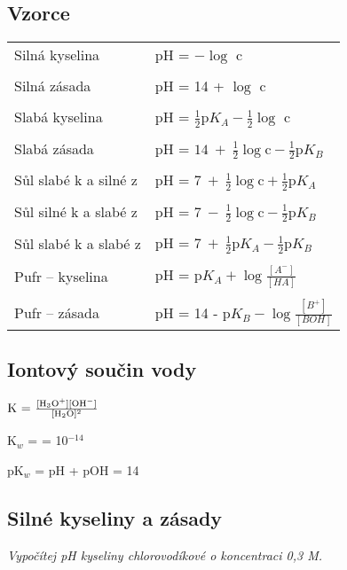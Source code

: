\subsection{Vzorce}

\begin{tabular}{ll}
	Silná kyselina & pH = $-\log$ c \\
	& \\
	Silná zásada & pH = 14 + $\log$ c \\
	& \\
	Slabá kyselina & pH = $\frac{1}{2}\textrm{p}K_A-\frac{1}{2}\log$ c \\
	& \\
	Slabá zásada & pH = $14\ +\ \frac{1}{2}\log\textrm{c} - \frac{1}{2}\textrm{p}K_B$ \\
	& \\
	Sůl slabé k a silné z & pH = $7\ +\ \frac{1}{2}\log\textrm{c} + \frac{1}{2}\textrm{p}K_A$ \\
	& \\
	Sůl silné k a slabé z & pH = $7\ -\ \frac{1}{2}\log\textrm{c} - \frac{1}{2}\textrm{p}K_B$ \\
	& \\
	Sůl slabé k a slabé z & pH = $7\ +\ \frac{1}{2}\textrm{p}K_A - \frac{1}{2}\textrm{p}K_B$ \\
	& \\
	Pufr -- kyselina & pH = $\textrm{p}K_A + \log \frac{[A^-]}{[HA]}$ \\
	& \\
	Pufr -- zásada & pH = 14 - $\textrm{p}K_B - \log \frac{[B^+]}{[BOH]}$ \\
\end{tabular}

\subsection{Iontový součin vody}

$\textrm{K = }\frac{[\ce{H3O+}][\ce{OH-}]}{[\ce{H2O}]^2}$

K$_w$ = \ce{[H3O+][OH-]} = 10$^{-14}$

pK$_w$ = pH + pOH = 14

\pagebreak

\subsection{Silné kyseliny a zásady}
\textit{Vypočítej pH kyseliny chlorovodíkové o koncentraci 0,3 M.}

